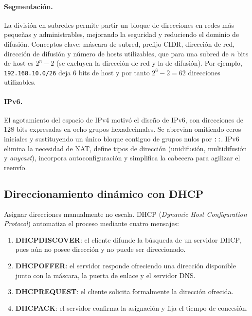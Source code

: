 \documentclass[11pt,a4paper]{article}
\begin{document}
\paragraph{Segmentación.} La división en subredes permite partir un bloque de
direcciones en redes más pequeñas y administrables, mejorando la seguridad y
reduciendo el dominio de difusión. Conceptos clave: máscara de subred, prefijo
CIDR, dirección de red, dirección de difusión y número de hosts utilizables,
que para una subred de $n$ bits de host es $2^{n}-2$ (se excluyen la dirección
de red y la de difusión). Por ejemplo, \texttt{192.168.10.0/26} deja 6 bits de
host y por tanto $2^{6}-2 = 62$ direcciones utilizables.

\paragraph{IPv6.} El agotamiento del espacio de IPv4 motivó el diseño de IPv6,
con direcciones de 128 bits expresadas en ocho grupos hexadecimales. Se
abrevian omitiendo ceros iniciales y sustituyendo un único bloque contiguo de
grupos nulos por \texttt{::}. IPv6 elimina la necesidad de NAT, define tipos de
dirección (unidifusión, multidifusión y \textit{anycast}), incorpora
autoconfiguración y simplifica la cabecera para agilizar el reenvío.

\subsection{Direccionamiento dinámico con DHCP}

Asignar direcciones manualmente no escala. DHCP (\textit{Dynamic Host
Configuration Protocol}) automatiza el proceso mediante cuatro mensajes:

\begin{enumerate}[leftmargin=*]
  \item \textbf{DHCPDISCOVER}: el cliente difunde la búsqueda de un servidor
        DHCP, pues aún no posee dirección y no puede ser direccionado.
  \item \textbf{DHCPOFFER}: el servidor responde ofreciendo una dirección
        disponible junto con la máscara, la puerta de enlace y el servidor DNS.
  \item \textbf{DHCPREQUEST}: el cliente solicita formalmente la dirección
        ofrecida.
  \item \textbf{DHCPACK}: el servidor confirma la asignación y fija el tiempo
        de concesión.
\end{enumerate}
\end{document}
